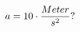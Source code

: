\documentclass[preview]{standalone}
\begin{document}
\begin{align*}
\special{dvisvgm:raw <g id='unique000'>}a = 10 \cdot \frac{Meter}{s^{2}} ?\special{dvisvgm:raw </g>}
\end{align*}
\end{document}
